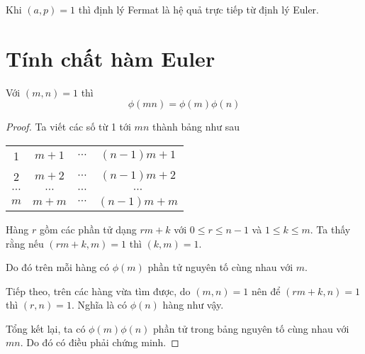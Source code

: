 \begin{remark}
    Khi $(a, p) = 1$ thì định lý Fermat là hệ quả trực tiếp từ định lý Euler.
\end{remark}

\section{Tính chất hàm Euler}

\begin{remark}
    Với $(m, n) = 1$ thì $$\phi(m n) = \phi(m) \phi(n)$$
\end{remark}

\begin{proof}
    Ta viết các số từ 1 tới $mn$ thành bảng như sau

    \begin{center}
        \begin{tabular}{c c c c}
            1 & $m+1$ & $\cdots$ & $(n-1)m + 1$ \\
            2 & $m+2$ & $\cdots$ & $(n-1)m + 2$ \\
            $\cdots$ & $\cdots$ & $\cdots$ & $\cdots$ \\
            $m$ & $m+m$ & $\cdots$ & $(n-1)m + m$
        \end{tabular}
    \end{center}
    
    Hàng $r$ gồm các phần tử dạng $r m + k$ với $0 \leq r \leq n-1$ và $1 \leq k \leq m$. 
    Ta thấy rằng nếu $(rm + k, m) = 1$ thì $(k, m) = 1$.

    Do đó trên mỗi hàng có $\phi(m)$ phần tử nguyên tố cùng nhau với $m$.

    Tiếp theo, trên các hàng vừa tìm được, do $(m, n) = 1$ nên để $(rm + k, n) = 1$ thì $(r, n) = 1$.
    Nghĩa là có $\phi(n)$ hàng như vậy.

    Tổng kết lại, ta có $\phi(m) \phi(n)$ phần tử trong bảng nguyên tố cùng nhau với $mn$. Do đó có điều phải chứng minh.
\end{proof}